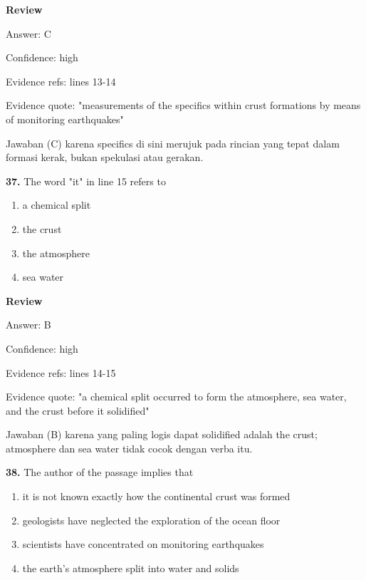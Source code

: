 \documentclass[12pt]{article}
\begin{document}
\par
\begingroup
\setlength{\parskip}{0pt}
\setlength{\parindent}{0pt}
\textbf{Review}\par
Answer: C\par
Confidence: high\par
Evidence refs: lines 13-14\par
Evidence quote: "measurements of the specifics within crust formations by means of monitoring earthquakes"\par
Jawaban (C) karena specifics di sini merujuk pada rincian yang tepat dalam formasi kerak, bukan spekulasi atau gerakan.\par
\endgroup
\par
\vspace{0.25\baselineskip}
\noindent\textbf{37.} The word "it" in line 15 refers to
\begin{enumerate}[label=(\Alph*),leftmargin=*,itemsep=0.2em]
\item a chemical split
\item the crust
\item the atmosphere
\item sea water
\end{enumerate}
\par
\begingroup
\setlength{\parskip}{0pt}
\setlength{\parindent}{0pt}
\textbf{Review}\par
Answer: B\par
Confidence: high\par
Evidence refs: lines 14-15\par
Evidence quote: "a chemical split occurred to form the atmosphere, sea water, and the crust before it solidified"\par
Jawaban (B) karena yang paling logis dapat solidified adalah the crust; atmosphere dan sea water tidak cocok dengan verba itu.\par
\endgroup
\par
\vspace{0.25\baselineskip}
\noindent\textbf{38.} The author of the passage implies that
\begin{enumerate}[label=(\Alph*),leftmargin=*,itemsep=0.2em]
\item it is not known exactly how the continental crust was formed
\item geologists have neglected the exploration of the ocean floor
\item scientists have concentrated on monitoring earthquakes
\item the earth's atmosphere split into water and solids
\end{enumerate}
\end{document}
